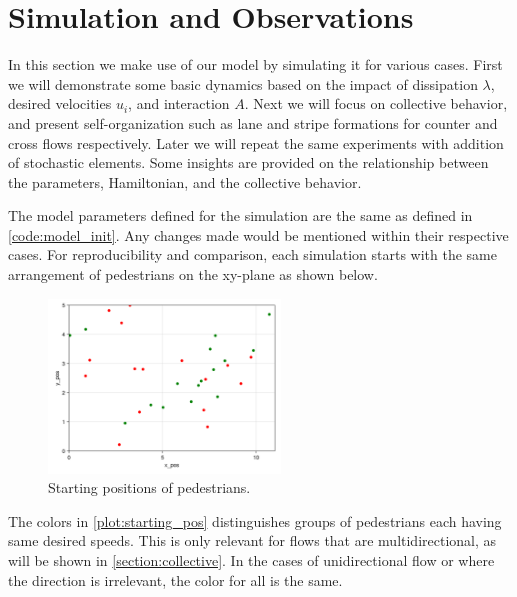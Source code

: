 \section{Simulation and Observations}
\label{section:observations}
In this section we make use of our model by simulating it for various cases. First we will demonstrate some basic dynamics based on the impact of dissipation $\lambda$, desired velocities $u_i$, and interaction $A$. Next we will focus on collective behavior, and present self-organization such as lane and stripe formations for counter and cross flows respectively. Later we will repeat the same experiments with addition of stochastic elements. Some insights are provided on the relationship between the parameters, Hamiltonian, and the collective behavior.

The model parameters defined for the simulation are the same as defined in \autoref{code:model_init}. Any changes made would be mentioned within their respective cases. For reproducibility and comparison, each simulation starts with the same arrangement of pedestrians on the xy-plane as shown below.
\begin{figure}[H]
    \centering
    \includegraphics[width=0.55\textwidth]{figures/ch5_basic/start_pos.png}
    \caption{Starting positions of pedestrians.}
    \label{plot:starting_pos}
\end{figure}
The colors in \autoref{plot:starting_pos} distinguishes groups of pedestrians each having same desired speeds. This is only relevant for flows that are multidirectional, as will be shown in \autoref{section:collective}. In the cases of unidirectional flow or where the direction is irrelevant, the color for all is the same.

